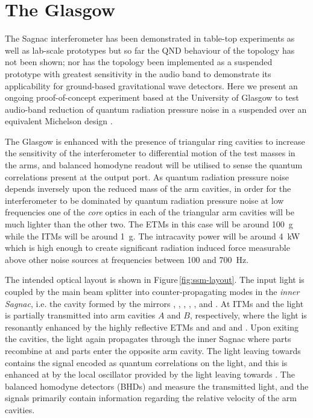 \section{The Glasgow \SSMEXPT{}}
The Sagnac interferometer has been demonstrated in table-top experiments \cite{Shaddock1998} as well as lab-scale prototypes \cite{Beyersdorf2002, Eberle2010} but so far the \gls{QND} behaviour of the \SSM{} topology has not been shown; nor has the topology been implemented as a suspended prototype with greatest sensitivity in the audio band to demonstrate its applicability for ground-based gravitational wave detectors. Here we present an ongoing proof-of-concept experiment based at the University of Glasgow to test audio-band reduction of quantum radiation pressure noise in a suspended \SSM{} over an equivalent Michelson design \cite{Graef2014}.

The Glasgow \SSMEXPT{} is enhanced with the presence of triangular ring cavities to increase the sensitivity of the interferometer to differential motion of the test masses in the arms, and balanced homodyne readout will be utilised to sense the quantum correlations present at the output port. As quantum radiation pressure noise depends inversely upon the reduced mass of the arm cavities, in order for the interferometer to be dominated by quantum radiation pressure noise at low frequencies one of the \emph{core} optics in each of the triangular arm cavities will be much lighter than the other two. The \glspl{ETM} in this case will be around \SI{100}{\gram} while the \glspl{ITM} will be around \SI{1}{\gram}. The intracavity power will be around \SI{4}{\kilo\watt} which is high enough to create significant radiation induced force measurable above other noise sources at frequencies between \num{100} and \SI{700}{\hertz}.

The intended optical layout is shown in Figure\,\ref{fig:ssm-layout}. The input light is coupled by the main beam splitter \MSIX{} into counter-propagating modes in the \emph{inner Sagnac}, i.e. the cavity formed by the mirrors \MSIX{}, \MSEVEN{}, \MONEA{}, \MTEN{}, \MNINE{}, \MEIGHT{} and \MONEB{}. At \glspl{ITM} \MONEA{} and \MONEB{} the light is partially transmitted into arm cavities $A$ and $B$, respectively, where the light is resonantly enhanced by the highly reflective \glspl{ETM} \MTWOA{} and \MTHREEA{} and \MTWOB{} and \MTHREEB{}. Upon exiting the cavities, the light again propagates through the inner Sagnac where parts recombine at \MSIX{} and parts enter the opposite arm cavity. The light leaving \MSIX{} towards \MFOURTEEN{} contains the signal encoded as quantum correlations on the light, and this is enhanced at \MSIXTEEN{} by the local oscillator provided by the light leaving \MSIX{} towards \MTWELVE{}. The balanced homodyne detectors (\glspl{BHD}) \HDA{} and \HDB{} measure the transmitted light, and the signals primarily contain information regarding the relative velocity of the arm cavities.

